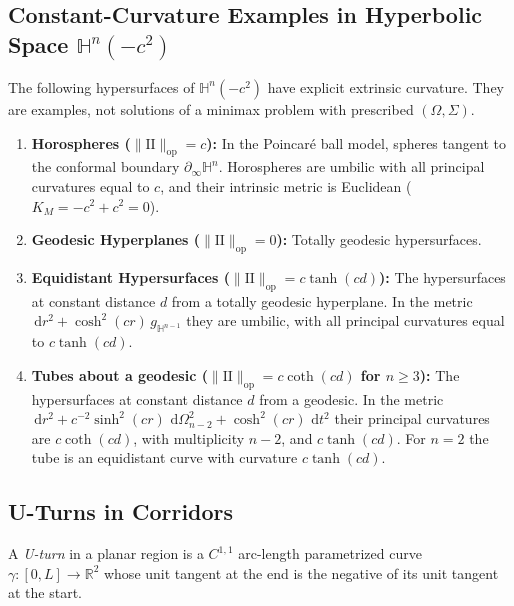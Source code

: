 \documentclass[11pt,reqno]{amsart}
\theoremstyle{definition}
\providecommand{\R}{\mathbb{R}}
\providecommand{\Hyp}{\mathbb{H}}
\providecommand{\II}{\mathrm{I\!I}}
\newcommand{\op}{\mathrm{op}}
\providecommand{\dif}{\,\mathrm{d}}
\numberwithin{equation}{section}
\providecommand{\Hyp}{\mathbb{H}}
\providecommand{\II}{\mathrm{II}}
\providecommand{\R}{\mathbb{R}}
\begin{document}
\subsection{Constant-Curvature Examples in Hyperbolic Space \texorpdfstring{$\Hyp^n(-c^2)$}{H\textasciicircum n(-c\textasciicircum 2)}}
The following hypersurfaces of $\Hyp^n(-c^2)$ have explicit extrinsic curvature. They are examples, not solutions of a minimax problem with prescribed $(\Omega, \Sigma)$.
\begin{enumerate}
    \item \textbf{Horospheres ($\|\II\|_{\op} = c$):} In the Poincar\'e ball model, spheres tangent to the conformal boundary $\partial_\infty \Hyp^n$. Horospheres are umbilic with all principal curvatures equal to $c$, and their intrinsic metric is Euclidean ($K_M = -c^2 + c^2 = 0$).
    \item \textbf{Geodesic Hyperplanes ($\|\II\|_{\op} = 0$):} Totally geodesic hypersurfaces.
    \item \textbf{Equidistant Hypersurfaces ($\|\II\|_{\op} = c \tanh(c d)$):} The hypersurfaces at constant distance $d$ from a totally geodesic hyperplane. In the metric $\dif r^2 + \cosh^2(cr)\, g_{\Hyp^{n-1}}$ they are umbilic, with all principal curvatures equal to $c\tanh(cd)$.
    \item \textbf{Tubes about a geodesic ($\|\II\|_{\op} = c \coth(c d)$ for $n \ge 3$):} The hypersurfaces at constant distance $d$ from a geodesic. In the metric $\dif r^2 + c^{-2}\sinh^2(cr)\, \dif\Omega_{n-2}^2 + \cosh^2(cr)\, \dif t^2$ their principal curvatures are $c\coth(cd)$, with multiplicity $n-2$, and $c\tanh(cd)$. For $n = 2$ the tube is an equidistant curve with curvature $c\tanh(cd)$.
\end{enumerate}

\subsection{U-Turns in Corridors}
A \emph{U-turn} in a planar region is a $C^{1,1}$ arc-length parametrized curve $\gamma\colon[0,L] \to \R^2$ whose unit tangent at the end is the negative of its unit tangent at the start.
\end{document}
